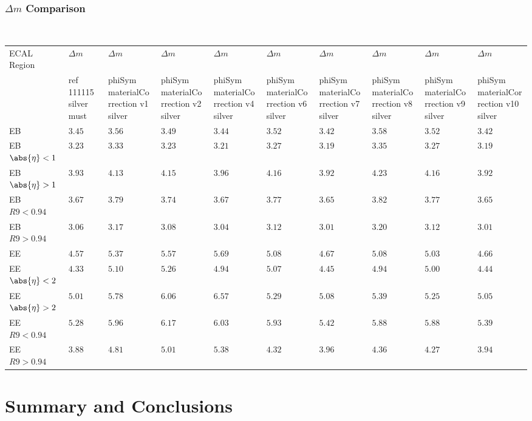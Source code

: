 \documentclass[8pt,serif]{beamer}
\begin{document}
\begin{frame}
  \frametitle{$ \Delta m$ Comparison}
\\


  
  \begin{center}
    \emph{\dataSample}\xspace \invMassVarName

\tiny \begin{tabular}{|l|p{30pt}|p{18pt}|p{18pt}|p{18pt}|p{18pt}|p{18pt}|p{18pt}|p{18pt}|p{18pt}|} \hline  
ECAL Region &  $\Delta m$ &  $\Delta m$ &  $\Delta m$ &  $\Delta m$ &  $\Delta m$ &  $\Delta m$ &  $\Delta m$ &  $\Delta m$ &  $\Delta m$ \\ 
 &  ref 111115 silver must &  phiSym materialCorrection v1 silver &  phiSym materialCorrection v2 silver &  phiSym materialCorrection v4 silver &  phiSym materialCorrection v6 silver &  phiSym materialCorrection v7 silver &  phiSym materialCorrection v8 silver &  phiSym materialCorrection v9 silver &  phiSym materialCorrection v10 silver \\ 
\hline                 
EB & $3.45$ & $3.56$ & $3.49$ & $3.44$ & $3.52$ & $3.42$ & $3.58$ & $3.52$ & $3.42$ \\
EB $\abs{\eta} < 1$ & $3.23$ & $3.33$ & $3.23$ & $3.21$ & $3.27$ & $3.19$ & $3.35$ & $3.27$ & $3.19$ \\
EB $\abs{\eta} > 1$ & $3.93$ & $4.13$ & $4.15$ & $3.96$ & $4.16$ & $3.92$ & $4.23$ & $4.16$ & $3.92$ \\
EB $R9 < 0.94$ & $3.67$ & $3.79$ & $3.74$ & $3.67$ & $3.77$ & $3.65$ & $3.82$ & $3.77$ & $3.65$ \\
EB $R9 > 0.94$ & $3.06$ & $3.17$ & $3.08$ & $3.04$ & $3.12$ & $3.01$ & $3.20$ & $3.12$ & $3.01$ \\
EE & $4.57$ & $5.37$ & $5.57$ & $5.69$ & $5.08$ & $4.67$ & $5.08$ & $5.03$ & $4.66$ \\
EE $\abs{\eta} < 2$ & $4.33$ & $5.10$ & $5.26$ & $4.94$ & $5.07$ & $4.45$ & $4.94$ & $5.00$ & $4.44$ \\
EE $\abs{\eta} > 2$ & $5.01$ & $5.78$ & $6.06$ & $6.57$ & $5.29$ & $5.08$ & $5.39$ & $5.25$ & $5.05$ \\
EE $R9 < 0.94$ & $5.28$ & $5.96$ & $6.17$ & $6.03$ & $5.93$ & $5.42$ & $5.88$ & $5.88$ & $5.39$ \\
EE $R9 > 0.94$ & $3.88$ & $4.81$ & $5.01$ & $5.38$ & $4.32$ & $3.96$ & $4.36$ & $4.27$ & $3.94$ \\
\hline  
\end{tabular}
\end{center}
\end{frame}
\section{Summary and Conclusions}
\end{document}
